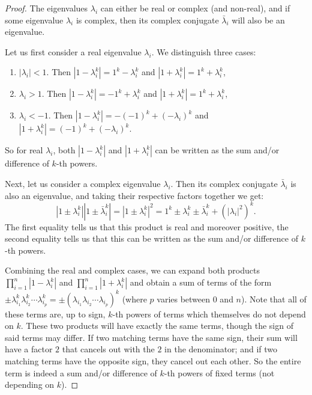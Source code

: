 \documentclass[a4paper]{article}
\theoremstyle{plain}
\theoremstyle{definition}
\theoremstyle{remark}
\newcommand{\cc}[1]{{\bar{#1}}}
\begin{document}
\begin{proof}
	The eigenvalues \(\lambda_i\) can either be real or complex (and non-real), and if some eigenvalue \(\lambda_i\) is complex, then its complex conjugate \(\cc{\lambda}_i\) will also be an eigenvalue.
	
	Let us first consider a real eigenvalue \(\lambda_i\). We distinguish three cases:
	\begin{enumerate}[(1)]
		\item \(|\lambda_i| < 1\). Then \(|1-\lambda_i^k| = 1^k-\lambda_i^k\) and \(|1+\lambda_i^k| = 1^k+\lambda_i^k\),
		\item \(\lambda_i > 1\). Then \(|1-\lambda_i^k| = -1^k+\lambda_i^k\) and \(|1+\lambda_i^k| = 1^k+\lambda_i^k\),
		\item \(\lambda_i < -1\). Then \(|1-\lambda_i^k| = -(-1)^k+(-\lambda_i)^k\) and \(|1+\lambda_i^k| = (-1)^k+(-\lambda_i)^k\).
	\end{enumerate}
	So for real \(\lambda_i\), both \(|1-\lambda_i^k|\) and \(|1+\lambda_i^k|\) can be written as the sum and/or difference of \(k\)-th powers.
	
	Next, let us consider a complex eigenvalue \(\lambda_i\). Then its complex conjugate \(\cc{\lambda}_i\) is also an eigenvalue, and taking their respective factors together we get:
	\begin{equation*}
	|1 \pm \lambda_i^k||1 \pm \cc{\lambda}_i^k| = |1\pm \lambda_i^k|^2 = 1^k  \pm \lambda_i^k  \pm \cc{\lambda}_i^k  + (|\lambda_i|^2)^k.
	\end{equation*}
	The first equality tells us that this product is real and moreover positive, the second equality tells us that this can be written as the sum and/or difference of \(k\)-th powers.
	

	Combining the real and complex cases, we can expand both products \(\prod_{i=1}^{n}|1-\lambda_i^k|\) and \(\prod_{i=1}^{n}|1+\lambda_i^k|\) and obtain a sum of terms of the form $\pm\lambda_{i_1}^k\lambda_{i_2}^k \cdots \lambda_{i_p}^k= \pm (\lambda_{i_1}\lambda_{i_2} \cdots \lambda_{i_p})^k$ (where $p$ varies between 0 and $n$). Note that all of these terms are, up to sign,   \(k\)-th powers of terms which themselves do not depend on $k$. These two products will have exactly the same terms, though the sign of said terms may differ. If two matching terms have the same sign, their sum will have a factor \(2\) that cancels out with the \(2\) in the denominator; and if two matching terms have the opposite sign, they cancel out each other. So the entire term is indeed a sum and/or difference of \(k\)-th powers of fixed terms (not depending on $k$).
\end{proof}
\end{document}
